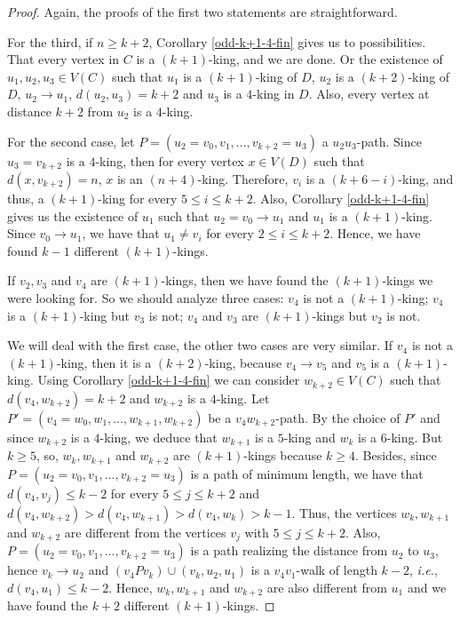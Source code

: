 \documentclass[preprint]{elsarticle}
\begin{document}
\begin{proof}
Again, the proofs of the first two statements are straightforward.

For the third, if $n \ge k+2$, Corollary \ref{odd-k+1-4-fin} gives us to possibilities.   That every vertex in $C$ is a $(k+1)$-king, and we are done.   Or the existence of $u_1, u_2, u_3 \in V(C)$ such that $u_1$ is a $(k+1)$-king of $D$, $u_2$ is a $(k+2)$-king of $D$, $u_2 \to u_1$, $d(u_2, u_3) = k+2$ and $u_3$ is a $4$-king in $D$.   Also, every vertex at distance $k+2$ from $u_2$ is a $4$-king.

For the second case, let $P = (u_2 = v_0, v_1, \dots, v_{k+2} = u_3)$ a $u_2 u_3$-path.   Since $u_3 = v_{k+2}$ is a $4$-king, then for every vertex $x \in V(D)$ such that $d(x, v_{k+2}) = n$, $x$ is an $(n+4)$-king.   Therefore, $v_i$ is a $(k+6-i)$-king, and thus, a $(k+1)$-king for every $5 \le i \le k+2$.   Also, Corollary \ref{odd-k+1-4-fin} gives us the existence of $u_1$ such that $u_2 = v_0 \to u_1$ and $u_1$ is a $(k+1)$-king.   Since $v_0 \to u_1$, we have that $u_1 \ne v_i$ for every $2 \le i \le k+2$.   Hence, we have found $k-1$ different $(k+1)$-kings.

If $v_2, v_3$ and $v_4$ are $(k+1)$-kings, then we have found the $(k+1)$-kings we were looking for.  So we should analyze three cases: $v_4$ is not a $(k+1)$-king; $v_4$ is a $(k+1)$-king but $v_3$ is not; $v_4$ and $v_3$ are $(k+1)$-kings but $v_2$ is not.

We will deal with the first case, the other two cases are very similar.   If $v_4$ is not a $(k+1)$-king, then it is a $(k+2)$-king, because $v_4 \to v_5$ and $v_5$ is a $(k+1)$-king.   Using Corollary \ref{odd-k+1-4-fin} we can consider $w_{k+2} \in V(C)$ such that $d(v_4, w_{k+2}) = k+2$ and $w_{k+2}$ is a $4$-king.   Let $P' = (v_4 = w_0, w_1, \dots, w_{k+1}, w_{k+2})$ be a $v_4 w_{k+2}$-path.   By the choice of $P'$ and since $w_{k+2}$ is a $4$-king, we deduce that $w_{k+1}$ is a $5$-king and $w_k$ is a $6$-king.   But $k \ge 5$, so, $w_k, w_{k+1}$ and $w_{k+2}$ are $(k+1)$-kings because $k \ge 4$.   Besides, since $P = (u_2 = v_0, v_1, \dots, v_{k+2} = u_3)$ is a path of minimum length, we have that $d(v_4, v_j) \le k-2$ for every $5 \le j \le k+2$ and $d(v_4, w_{k+2}) > d(v_4, w_{k+1}) > d(v_4, w_k) > k-1$.   Thus, the vertices $w_k, w_{k+1}$ and $w_{k+2}$ are different from the vertices $v_j$ with $5 \le j \le k+2$.   Also, $P = (u_2 = v_0, v_1, \dots, v_{k+2} = u_3)$ is a path realizing the distance from $u_2$ to $u_3$, hence $v_k \to u_2$ and $(v_4 P v_k) \cup (v_k, u_2, u_1)$ is a $v_4 v_1$-walk of length $k-2$, \emph{i.e.}, $d(v_4, u_1) \le k-2$.   Hence, $w_k, w_{k+1}$ and $w_{k+2}$ are also different from $u_1$ and we have found the $k+2$ different $(k+1)$-kings.
\end{proof}
\end{document}
